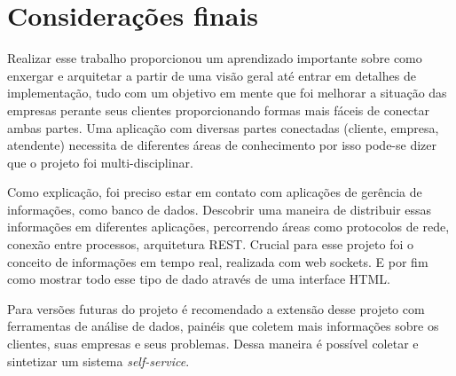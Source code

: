 \chapter[Considerações finais]{Considerações finais}\label{chap:conclusao}

Realizar esse trabalho proporcionou um aprendizado importante sobre como enxergar e arquitetar a partir de uma visão geral até entrar em detalhes de implementação, tudo com um objetivo em mente que foi melhorar a situação das empresas perante seus clientes proporcionando formas mais fáceis de conectar ambas partes. Uma aplicação com diversas partes conectadas (cliente, empresa, atendente) necessita de diferentes áreas de conhecimento por isso pode-se dizer que o projeto foi multi-disciplinar.

Como explicação, foi preciso estar em contato com aplicações de gerência de informações, como banco de dados. Descobrir uma maneira de distribuir essas informações em diferentes aplicações, percorrendo áreas como protocolos de rede, conexão entre processos, arquitetura REST. Crucial para esse projeto foi o conceito de informações em tempo real, realizada com web sockets. E por fim como mostrar todo esse tipo de dado através de uma interface HTML. 

Para versões futuras do projeto é recomendado a extensão desse projeto com ferramentas de análise de dados, painéis que coletem mais informações sobre os clientes, suas empresas e seus problemas. Dessa maneira é possível coletar e sintetizar um sistema \textit{self-service}.